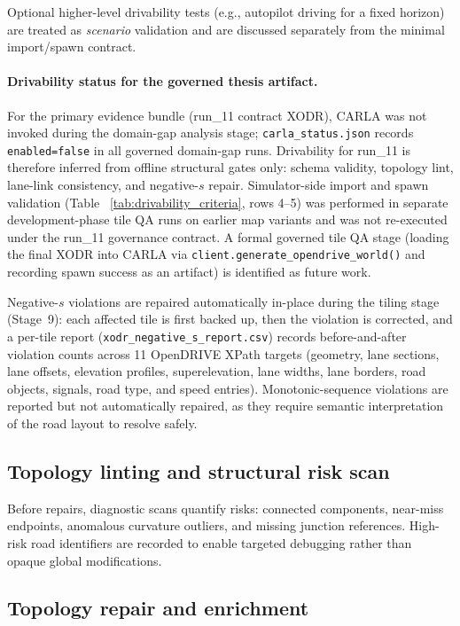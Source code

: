 Optional higher-level drivability tests (e.g., autopilot driving for a fixed horizon) are treated as \emph{scenario} validation and are discussed separately from the minimal import/spawn contract.
\paragraph{Drivability status for the governed thesis artifact.}
For the primary evidence bundle (run\_11 contract XODR), CARLA was not invoked during the domain-gap analysis stage; \texttt{carla_status.json} records \texttt{enabled=false} in all governed domain-gap runs. Drivability for run\_11 is therefore inferred from offline structural gates only: schema validity, topology lint, lane-link consistency, and negative-$s$ repair. Simulator-side import and spawn validation (Table~
\ref{tab:drivability_criteria}, rows 4--5) was performed in separate development-phase tile QA runs on earlier map variants and was not re-executed under the run\_11 governance contract. A formal governed tile QA stage (loading the final XODR into CARLA via \texttt{client.generate_opendrive_world()} and recording spawn success as an artifact) is identified as future work.

Negative-$s$ violations are repaired automatically in-place during the tiling stage
(Stage~9): each affected tile is first backed up, then the violation is corrected,
and a per-tile report (\texttt{xodr\_negative\_s\_report.csv}) records before-and-after
violation counts across 11 OpenDRIVE XPath targets (geometry, lane sections, lane offsets,
elevation profiles, superelevation, lane widths, lane borders, road objects, signals,
road type, and speed entries).
Monotonic-sequence violations are reported but not automatically repaired, as they
require semantic interpretation of the road layout to resolve safely.

\subsection{Topology linting and structural risk scan}
Before repairs, diagnostic scans quantify risks: connected components, near-miss endpoints, anomalous curvature outliers, and missing junction references. High-risk road identifiers are recorded to enable targeted debugging rather than opaque global modifications.

\subsection{Topology repair and enrichment}
